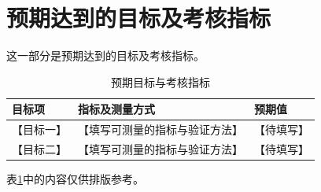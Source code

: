 \section{预期达到的目标及考核指标}
这一部分是预期达到的目标及考核指标。
\begin{table}[htbp]
	\centering
	\caption{预期目标与考核指标}
	\label{tab:targets}
	
	\begin{tabularx}{0.96\textwidth}{
			>{\centering\arraybackslash}p{}
			>{\centering\arraybackslash}X
			>{\centering\arraybackslash}p{}
		}
		\toprule
		目标项 & 指标及测量方式 & 预期值\\
		\midrule
		【目标一】 & 【填写可测量的指标与验证方法】 & 【待填写】\\
		【目标二】 & 【填写可测量的指标与验证方法】 & 【待填写】\\
		\bottomrule
	\end{tabularx}
\end{table}

表\ref{tab:targets}中的内容仅供排版参考。